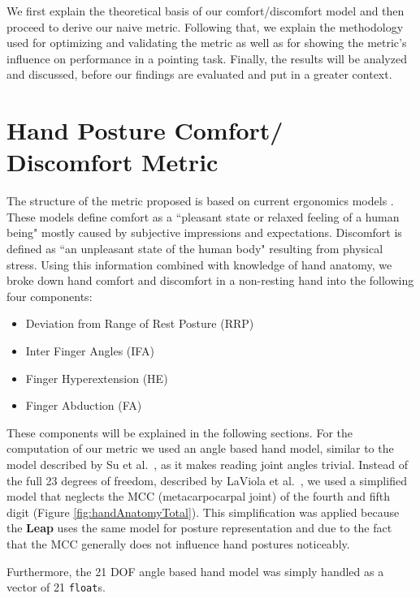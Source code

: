 \documentclass[headsepline,footsepline,footinclude=false,oneside,fontsize=11pt,paper=a4,listof=totoc,bibliography=totoc]{scrbook} %
\begin{document}
We first explain the theoretical basis of our comfort/discomfort model and then proceed to derive our naive metric. Following that, we explain the methodology used for optimizing and validating the metric as well as for showing the metric's influence on performance in a pointing task. Finally, the results will be analyzed and discussed, before our findings are evaluated and put in a greater context.


\section{Hand Posture Comfort/ Discomfort Metric}
The structure of the metric proposed is based on current ergonomics models \cite{vink2012editorial}. These models define comfort as a ``pleasant state or relaxed feeling of a human being" mostly caused by subjective impressions and expectations. Discomfort is defined as ``an unpleasant state of the human body" resulting from physical stress. Using this information combined with knowledge of hand anatomy, we broke down hand comfort and discomfort in a non-resting hand into the following four components: 

\begin{itemize}
	\item Deviation from Range of Rest Posture (RRP)
	\item Inter Finger Angles (IFA)
	\item Finger Hyperextension (HE)
	\item Finger Abduction (FA)
\end{itemize}

These components will be explained in the following sections. For the computation of our metric we used an angle based hand model, similar to the model described by Su et al.~\cite{su1994logical}, as it makes reading joint angles trivial. Instead of the full 23 degrees of freedom, described by LaViola et al.~\cite{laviola1999survey}, we used a simplified model that neglects the MCC (metacarpocarpal joint) of the fourth and fifth digit (Figure \ref{fig:handAnatomyTotal}). This simplification was applied because the \textbf{Leap} uses the same model for posture representation and due to the fact that the MCC generally does not influence hand postures noticeably.

Furthermore, the 21 DOF angle based hand model was simply handled as a vector of 21 \texttt{float}s. 
\end{document}
